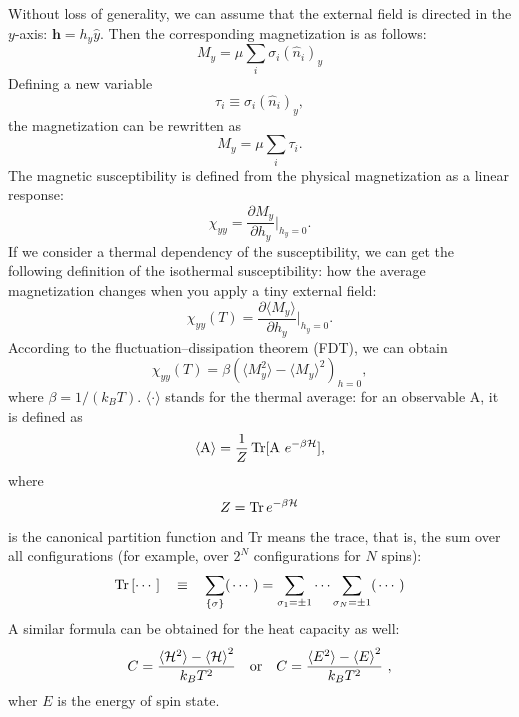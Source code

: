 \documentclass[
    aps,
    prb,
    reprint,           %
    superscriptaddress,%
    amsmath,amssymb,
    floatfix
]{revtex4-2}
\begin{document}
Without loss of generality, we can assume that the external field is directed in the $y$-axis: $\mathbf{h}=h_{y}\widehat{y}$. Then the corresponding magnetization is as follows: 
\begin{equation}
M_{y}=\mu \sum_i {\sigma }_i({\widehat{n}}_i)_{y} 
 \label{eq:mag-y}
\end{equation}
Defining a new variable
\begin{equation}
{\tau }_i\equiv \sigma_i({\widehat{n}}_i)_{y}, 	
 \label{eq:tau}
\end{equation}
the magnetization can be rewritten as
\begin{equation}
M_{y}=\mu \sum_i {\tau }_i. 
 \label{eq:mag-gaugeinv-y}
\end{equation} 
The magnetic susceptibility is defined from the physical magnetization as a linear response:
\begin{equation}
{\chi }_{yy}=\frac{\partial M_{y}}{\partial h_{y}}\Big|_{h_{y}=0}.		
 \label{eq:susc1}
\end{equation}
If we consider a thermal dependency of the susceptibility, we can get the following definition of the isothermal susceptibility: how the average magnetization changes when you apply a tiny external field:
\begin{equation}
{\chi }_{yy}(T)=\frac{\partial \langle M_y\rangle}{\partial h_y} \Big|_{h_y=0}.		
 \label{eq:susc-ther}
\end{equation}
According to the fluctuation–dissipation theorem (FDT), we can obtain
\begin{equation}
{\chi }_{yy}\left(T\right)=\beta {\left(\langle M_y^{2}\rangle-\langle M_y\rangle^{2}\right)}_{h=0},
 \label{eq:mag-fdt}
\end{equation}
where $\beta =1/(k_{B}T)$. $\langle \cdot \rangle$ stands for the thermal average: for an observable A, it is defined as
\begin{equation}
\langle \mathrm{A}\rangle =\frac{1}{Z}\text{\,}\mathrm{Tr}[\mathrm{A}\ e^{-\beta \mathcal{H}}], 
\label{eq:mag-fdt}
\end{equation}
where 
\begin{equation}
Z=\mathrm{Tr}\text{\,}e^{-\beta \mathcal{H}}	
\end{equation}
is the canonical partition function and Tr means the trace, that is, the sum over all configurations (for example, over $2^N$ configurations for $N$ spins):
\begin{equation}
\mathrm{Tr}\left[\cdots \text{\,}\right]\text{\; \,}\equiv \text{\; \,}\sum_{\left\{\sigma \right\}} (\left.\cdots \text{\,}\right)=\sum_{{\sigma }_1=\pm 1} \cdots \sum_{{\sigma }_{N}=\pm 1} (\left.\cdots \text{\,}\right)		
 \label{eq:Trdef}
\end{equation}
A similar formula can be obtained for the heat capacity as well:
\begin{equation}
C=\frac{\langle {\mathcal{H}}^{2}\rangle -{\langle \mathcal{H}\rangle }^{2}}{k_{B}T^{2}}  
\qq{\text{or}}  
C=\frac{\langle E^{2}\rangle -{\langle E\rangle }^{2}}{k_{B}T^{2}}\ 
 \label{eq:cap-fdt},
\end{equation}
wher $E$ is the energy of spin state.
\end{document}
